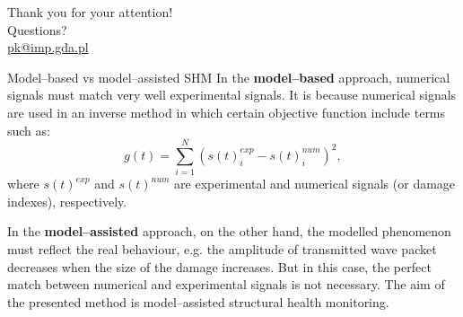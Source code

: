 \documentclass[10pt]{beamer} %
\begin{document}
{
\begin{frame}[standout]
  Thank you for your attention!\\ \vspace{12pt}
  Questions?\\ \vspace{12pt}
  \url{pk@imp.gda.pl}
\end{frame}
}
\appendix
\begin{frame}{Model--based vs model--assisted SHM}
	 In the \textbf{model--based} approach, numerical signals must match very well experimental signals. It is because numerical signals are used in an inverse method in which certain objective function include terms such as:
	\begin{equation*}
	g(t) = \sum_{i=1}^{N} \left(s(t)_i^{exp} - s(t)_i^{num}\right)^2,
	\label{eq:obj_fun}
	\end{equation*}
	where $s(t)^{exp}$ and $s(t)^{num}$ are experimental and numerical signals (or damage indexes), respectively.
	
	In the \textbf{model--assisted} approach, on the other hand, the modelled phenomenon must reflect the real behaviour, e.g. the amplitude of transmitted wave packet decreases when the size of the damage increases. But in this case, the perfect match between numerical and experimental signals is not necessary. The aim of the presented method is model--assisted structural health monitoring.
\end{frame}
\end{document}
